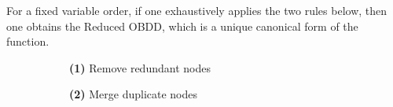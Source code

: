 \documentclass[english, aspectratio=169]{beamer}
\begin{document}
\begin{frame}
  \frametitle{\secname}

  \begin{theorem}[Bryant '86]
    For a fixed variable order, if one exhaustively applies the two rules below,
    then one obtains the Reduced OBDD, which is a unique canonical form of the
    function.
  \end{theorem}

  \begin{figure}
    \centering

    \begin{subfigure}[b]{0.40\linewidth}
      \centering

      \begin{tikzpicture}[scale=0.9, every node/.style={transform shape}]
        
      \end{tikzpicture}

      \vspace{10pt}
      {\small {\bf (1)} Remove redundant nodes}
    \end{subfigure}
    \begin{subfigure}[b]{0.59\linewidth}
      \centering

      \begin{tikzpicture}[scale=0.9, every node/.style={transform shape}]
        
      \end{tikzpicture}

      \vspace{10pt}
      {\small {\bf (2)} Merge duplicate nodes}
    \end{subfigure}

  \end{figure}
\end{frame}
\end{document}
